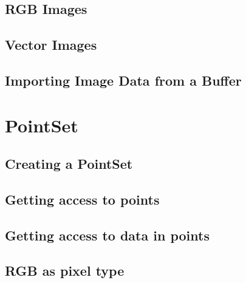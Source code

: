 


\subsection{RGB Images}
\label{sec:DefiningRGBImages}




\subsection{Vector Images}
\label{sec:DefiningVectorImages}




\subsection{Importing Image Data from a Buffer}
\label{sec:ImportingImageDataFromABuffer}




\section{PointSet}
\label{PointSetSection}

\subsection{Creating a PointSet}
\label{sec:CreatingAPointSet}





\subsection{Getting access to points}
\label{sec:GettingAccessToPointsInThePointSet}





\subsection{Getting access to data in points}
\label{sec:GettingAccessToDataInThePointSet}





\subsection{RGB as pixel type}
\label{sec:PointSetWithRGBAsPixelType}

